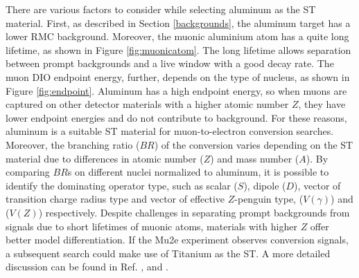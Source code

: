 There are various factors to consider while selecting aluminum as the ST material. 
First, as described in Section \ref{backgrounds}, the aluminum 
target has a lower RMC background. Moreover, the muonic aluminium 
atom has a quite long lifetime, as shown in Figure \ref{fig:muonicatom}. 
The long lifetime allows separation between prompt backgrounds and a 
live window with a good decay rate. The muon DIO endpoint energy, 
further, depends on the type of nucleus, as shown in Figure \ref{fig:endpoint}. 
Aluminum has a high endpoint energy, so when muons are captured on other 
detector materials with a higher atomic number $Z$, they have lower 
endpoint energies and do not contribute to background. For these reasons, aluminum is a 
suitable ST material for muon-to-electron conversion searches.
Moreover, the branching ratio ($BR$) of the conversion varies 
depending on the ST material due to differences in atomic number 
($Z$) and mass number ($A$). By comparing $BR$s on different nuclei 
normalized to aluminum, it is possible to identify the dominating 
operator type, such as scalar ($S$), dipole ($D$), vector of 
transition charge radius type and vector of effective $Z$-penguin type, 
($V(\gamma)$) and ($V(Z)$) respectively. 
Despite challenges in separating prompt backgrounds from 
signals due to short lifetimes of muonic atoms, 
materials with higher $Z$ offer better model differentiation. 
If the Mu2e experiment observes conversion signals, a subsequent search 
could make use of Titanium as the ST. A more detailed discussion can be 
found in Ref. \cite{PhysRevD.80.013002}, \cite{PhysRevD.76.059902} and 
\cite{abusalma2018expression}.


